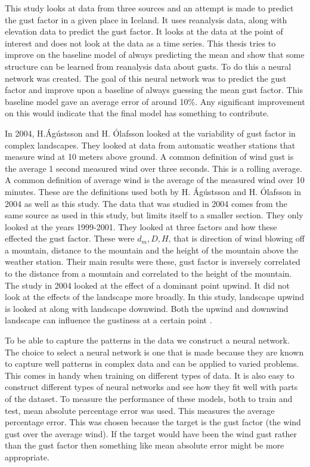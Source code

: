 This study looks at data from three sources and an attempt is made to predict the gust factor in a given place in Iceland. It uses reanalysis data, along with elevation data to predict the gust factor. It looks at the data at the point of interest and does not look at the data as a time series. This thesis tries to improve on the baseline model of always predicting the mean and show that some structure can be learned from reanalysis data about gusts. To do this a neural network was created. The goal of this neural network was to predict the gust factor and improve upon a baseline of always guessing the mean gust factor. This baseline model gave an average error of around 10\%. Any significant improvement on this would indicate that the final model has something to contribute.

In 2004, H.Ágústsson and H. Ólafsson looked at the variability of gust factor in complex landscapes. They looked at data from automatic weather stations that measure wind at 10 meters above ground. A common definition of wind gust is the average 1 second measured wind over three seconds. This is a rolling average. A common definition of average wind is the average of the measured wind over 10 minutes. These are the definitions used both by H. Ágústsson and H. Ólafsson in 2004 as well as this study. The data that was studied in 2004 comes from the same source as used in this study, but limits itself to a smaller section. They only looked at the years 1999-2001. They looked at three factors and how these effected the gust factor. These were $d_m, D, H$, that is direction of wind blowing off a mountain, distance to the mountain and the height of the mountain above the weather station. Their main results were these, gust factor is inversely correlated to the distance from a mountain and correlated to the height of the mountain. The study in 2004 looked at the effect of a dominant point upwind. It did not look at the effects of the landscape more broadly. In this study, landscape upwind is looked at along with landscape downwind. Both the upwind and downwind landscape can influence the gustiness at a certain point \cite{GNP_vidtal}.

To be able to capture the patterns in the data we construct a neural network. The choice to select a neural network is one that is made because they are known to capture well patterns in complex data and can be applied to varied problems. This comes in handy when training on different types of data. It is also easy to construct different types of neural networks and see how they fit well with parts of the dataset. To measure the performance of these models, both to train and test, mean absolute percentage error was used. This measures the average percentage error. This was chosen because the target is the gust factor (the wind gust over the average wind). If the target would have been the wind gust rather than the gust factor then something like mean absolute error might be more appropriate.